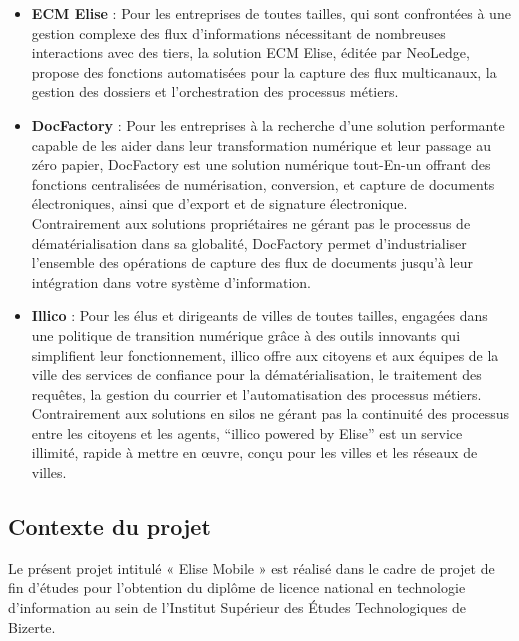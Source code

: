 \medskip
\begin{itemize}
\item \textbf{ECM Elise}\cite{eliseECM} : Pour les entreprises de toutes tailles, qui sont confrontées à une gestion complexe des flux d'informations nécessitant de nombreuses interactions avec des tiers, la solution ECM Elise, éditée par NeoLedge, propose des fonctions automatisées pour la capture des flux multicanaux, la gestion des dossiers et l'orchestration des processus métiers.

\item \textbf{DocFactory}\cite{docFactory} : Pour les entreprises à la recherche d'une solution performante capable de les aider dans leur transformation numérique et leur passage au zéro papier, DocFactory est une solution numérique tout-En-un offrant des fonctions centralisées de numérisation, conversion, et capture de documents électroniques, ainsi que d'export et de signature électronique.\\
Contrairement aux solutions propriétaires ne gérant pas le processus de dématérialisation dans sa globalité, DocFactory permet d'industrialiser l'ensemble des opérations de capture des flux de documents jusqu'à leur intégration dans votre système d'information.



\item \textbf{Illico}\cite{illico} : Pour les élus et dirigeants de villes de toutes tailles, engagées dans une politique de transition numérique grâce à des outils innovants qui simplifient leur fonctionnement, illico offre aux citoyens et aux équipes de la ville des services de confiance pour la dématérialisation, le traitement des requêtes, la gestion du courrier et l'automatisation des processus métiers. Contrairement aux solutions en silos ne gérant pas la continuité des processus entre les citoyens et les agents, “illico powered by Elise” est un service illimité, rapide à mettre en œuvre, conçu pour les villes et les réseaux de villes.


\end{itemize}

\subsection{Contexte du projet}
Le présent projet intitulé « Elise Mobile » est réalisé dans le cadre de projet de fin d'études pour l'obtention du diplôme de licence national en technologie d'information au sein de l'Institut Supérieur des Études Technologiques de Bizerte.

